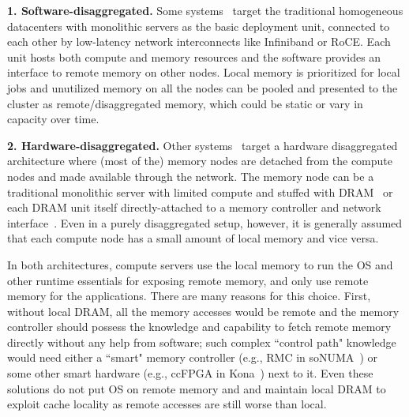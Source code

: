 \vspace{3pt}
\noindent \textbf{1. Software-disaggregated.}
Some systems~\cite{gms,cashmere,infiniswap,remregions,
leap,zswap} target the traditional homogeneous 
datacenters with monolithic servers as the basic 
deployment unit, connected to each other by low-latency 
network interconnects like Infiniband or RoCE. Each 
unit hosts both compute and memory resources and the 
software provides an interface to remote memory 
on other nodes. Local memory is prioritized for 
local jobs and unutilized memory on all the nodes 
can be pooled and presented to the cluster as 
remote/disaggregated memory, which could be static 
or vary in capacity over time. 

\vspace{3pt}
\noindent \textbf{2. Hardware-disaggregated.}
Other systems~\cite{kona,aifm,fastswap,semeru,legoos} 
target a hardware disaggregated architecture where (most 
of the) memory nodes are detached from the compute nodes 
and made available through the network. The memory node 
can be a traditional monolithic server with limited 
compute and stuffed with DRAM~\cite{fastswap} or 
each DRAM unit itself directly-attached to a memory 
controller and network interface~\cite{legoos}. 
Even in a purely disaggregated setup, however, 
it is generally assumed that each compute node has 
a small amount of local memory and vice 
versa.~\cite{legoos,kona}

In both architectures, compute servers use the local memory 
to run the OS and other runtime essentials for exposing remote 
memory, and only use remote memory for the applications. 
There are many reasons for this choice. 
First, without local DRAM, all the memory 
accesses would be remote and the memory controller should 
possess the knowledge and capability to fetch remote memory 
directly without any help from software; such complex ``control 
path" knowledge would need either a ``smart" memory controller 
(e.g., RMC in soNUMA~\cite{sonuma}) or some other smart 
hardware (e.g., ccFPGA in Kona~\cite{kona}) next to it. 
Even these solutions do not put OS on remote memory and 
and maintain local DRAM to exploit cache locality as remote 
accesses are still worse than local.

